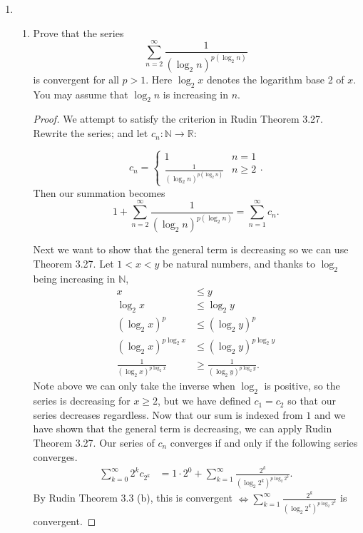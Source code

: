 \documentclass{article}
\begin{document}
\begin{enumerate} 
\item \begin{enumerate}
        \item Prove that the series $$\sum_{n=2}^\infty\frac1{(\log_2n)^{p(\log_2n)}}$$
        is convergent for all $p>1.$ Here $\log_2x$ denotes the logarithm base 2 of $x.$ You may assume
        that $\log_2n$ is increasing in $n.$

        \begin{proof} 
            We attempt to satisfy the criterion in Rudin Theorem 3.27. Rewrite the series; 
            and let $c_n:\mathbb{N}\to \mathbb{R}$:
            
            \[
            c_n=\begin{cases}
                1&n=1\\
                \frac1{(\log_2n)^{p(\log_2n)}}&n\ge 2
            \end{cases}
            .\] 
            Then our summation becomes
            \[
                1+\sum_{n=2}^\infty\frac1{(\log_2n)^{p(\log_2n)}}=
                 \sum_{n=1}^{\infty} c_n
            .\] 

            Next we want to show that the general term is decreasing so we can use Theorem 3.27. Let $1<x<y$
            be natural numbers, and thanks to $\log_2$ being increasing in $\mathbb{N}$,
            \begin{align*}
                x&\leq y\\
                \log_2 x&\leq\log_2 y\\
                (\log_2 x)^{p}&\leq(\log_2 y)^{p}\\
                (\log_2 x)^{p\log_2 x}&\leq(\log_2 y)^{p\log_2 y}\\
                \frac{1}{(\log_2 x)^{p\log_2 x}}&\geq\frac{1}{(\log_2 y)^{p\log_2 y}}
            .\end{align*}
            Note above we can only take the inverse when $\log_2$ is positive, so the series is decreasing 
            for $x\geq 2$, but we have defined $c_1=c_2$ so that our series decreases regardless.
            Now that our sum is indexed from $1$ and we have shown that the general term is decreasing,
            we can apply Rudin Theorem 3.27. Our series of $c_n$ converges if and only if the following 
            series converges.
            \begin{align*}
                \sum_{k=0}^{\infty} 2^kc_{2^k}
                &= 1\cdot 2^0+  \sum_{k=1}^{\infty} \frac{2^k}{\left(\log_2 2^k\right)^{p\log_2 2^k}} 
            .\end{align*}   
            By Rudin Theorem 3.3 (b), this is convergent $\iff \sum\limits_{k=1}^{\infty} \frac{2^k}{\left(\log_2 2^k\right)^{p\log_2 2^k}} $ is convergent.


\end{proof}
\end{enumerate}
\end{enumerate}
\end{document}
